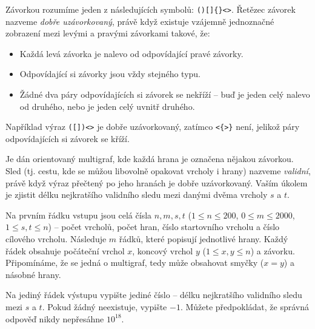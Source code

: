
\usepackage[czech]{babel}










Závorkou rozumíme jeden z následujících symbolů: \texttt{()[]\{\}<>}. Řetězec závorek nazveme \textit{dobře uzávorkovaný},
právě když existuje vzájemně jednoznačné zobrazení mezi levými a pravými závorkami takové, že:
\begin{itemize}
 \item Každá levá závorka je nalevo od odpovídající pravé závorky.
 \item Odpovídající si závorky jsou vždy stejného typu.
 \item Žádné dva páry odpovídajících si závorek se nekříží -- buď je jeden celý nalevo od druhého, nebo je jeden celý uvnitř druhého.
\end{itemize}
Například výraz \texttt{([])<>} je dobře uzávorkovaný, zatímco \texttt{<\{>\}} není, jelikož páry odpovídajících si závorek se kříží.

Je dán orientovaný multigraf, kde každá hrana je označena nějakou závorkou.
Sled (tj. cestu, kde se můžou libovolně opakovat vrcholy i hrany)
nazveme \textit{validní}, právě když výraz přečtený po jeho hranách je dobře uzávorkovaný.
Vaším úkolem je zjistit délku nejkratšího validního sledu mezi danými dvěma vrcholy $s$ a $t$.



Na prvním řádku vstupu jsou celá čísla $n, m, s, t$ ($1 \leq n \leq 200$, $0 \leq m \leq 2000$, $1 \leq s, t \leq n$) -- počet vrcholů, počet hran, číslo startovního vrcholu a číslo cílového vrcholu.
Následuje $m$ řádků, které popisují jednotlivé hrany. Každý řádek obsahuje počáteční vrchol $x$, koncový vrchol $y$
($1 \leq x, y \leq n$) a závorku. Připomínáme, že se jedná o multigraf, tedy může obsahovat smyčky ($x=y$)
a násobné hrany.


Na jediný řádek výstupu vypište jediné číslo -- délku nejkratšího validního sledu mezi $s$ a $t$.
Pokud žádný neexistuje, vypište $-1$. Můžete předpokládat, že správná odpověď nikdy nepřesáhne $10^{18}$.

